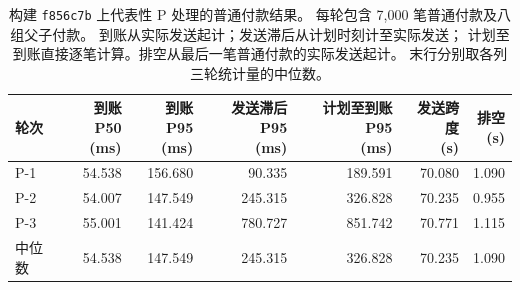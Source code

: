 \begin{table}[t]
\centering
\caption{构建 \texttt{f856c7b} 上代表性 P 处理的普通付款结果。
每轮包含 7,000 笔普通付款及八组父子付款。
到账从实际发送起计；发送滞后从计划时刻计至实际发送；
计划至到账直接逐笔计算。排空从最后一笔普通付款的实际发送起计。
末行分别取各列三轮统计量的中位数。}
\label{tab:current-p}
\small
\setlength{\tabcolsep}{5pt}
\begin{tabular}{lrrrrrr}
\toprule
轮次 &
\shortstack{到账 P50\\(ms)} &
\shortstack{到账 P95\\(ms)} &
\shortstack{发送滞后 P95\\(ms)} &
\shortstack{计划至到账 P95\\(ms)} &
\shortstack{发送跨度\\(s)} &
\shortstack{排空\\(s)} \\
\midrule
P-1 & 54.538 & 156.680 &  90.335 & 189.591 & 70.080 & 1.090 \\
P-2 & 54.007 & 147.549 & 245.315 & 326.828 & 70.235 & 0.955 \\
P-3 & 55.001 & 141.424 & 780.727 & 851.742 & 70.771 & 1.115 \\
\midrule
中位数 & 54.538 & 147.549 & 245.315 & 326.828 & 70.235 & 1.090 \\
\bottomrule
\end{tabular}
\end{table}